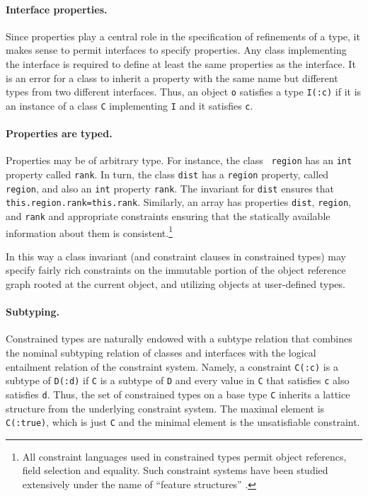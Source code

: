 \paragraph{Interface properties.}
Since properties play a central role in the specification of
refinements of a type, it makes sense to permit interfaces to specify
properties. Any class implementing the interface is required to define
at least the same properties as the interface. It is an error for a
class to inherit a property with the same name but different types
from two different interfaces.  Thus, an object {\tt o} satisfies a
type {\tt I(:c)} if it is an instance of a class {\tt C} implementing
{\tt I} and it satisfies {\tt c}.

\paragraph{Properties are typed.}
Properties may be of arbitrary type. For instance, the class {\tt
region} has an {\tt int} property called {\tt rank}. In turn, the
class {\tt dist} has a {\tt region} property, called {\tt region}, and
also an {\tt int} property {\tt rank}.  The invariant for {\tt dist}
ensures that {\tt this.region.rank=this.rank}. Similarly, an array has
properties {\tt dist}, {\tt region}, and {\tt rank}
and appropriate constraints ensuring that the statically available
information about them is consistent.\footnote{All constraint
languages used in constrained types permit object referencs, field
selection and equality. Such constraint systems have been studied
extensively under the name of ``feature structures''
\cite{feature-structures}.}

In this way a class invariant (and constraint clauses in constrained
types) may specify fairly rich constraints on the immutable portion of
the object reference graph rooted at the current object, and utilizing
objects at user-defined types.

\paragraph{Subtyping.} 
Constrained types are naturally endowed with a subtype relation that
combines the nominal subtyping relation of classes and interfaces with
the logical entailment relation of the constraint system. Namely, a
constraint {\tt C(:c)} is a subtype of {\tt D(:d)} if {\tt C} is a
subtype of {\tt D} and every value in {\tt C} that satisfies {\tt c}
also satisfies {\tt d}. Thus, the set of constrained types on a base
type {\tt C} inherits a lattice structure from the underlying
constraint system. The maximal element is {\tt C(:true)}, which is
just {\tt C} and the minimal element is the unsatisfiable constraint.


